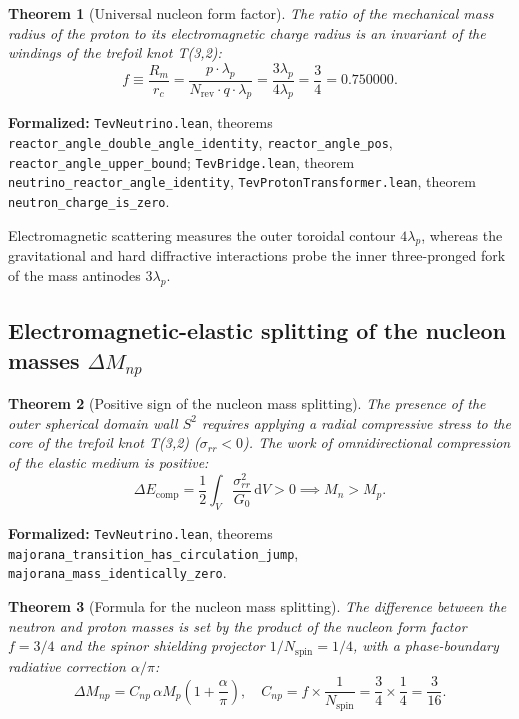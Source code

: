 \documentclass[11pt,a4paper]{article}
\newtheorem{theorem}{Theorem}
\theoremstyle{definition}
\theoremstyle{remark}
\begin{document}
\begin{theorem}[Universal nucleon form factor]
\label{thm:nucleon_form_factor}
The ratio of the mechanical mass radius of the proton to its electromagnetic charge radius is an invariant of the windings of the trefoil knot T(3,2):
\begin{equation}
	f \equiv \frac{R_m}{r_c} = \frac{p \cdot \lambda_p}{N_{\mathrm{rev}} \cdot q \cdot \lambda_p} = \frac{3 \lambda_p}{4 \lambda_p} = \frac{3}{4} = 0.750000.
	\label{eq:nucleon_form_factor_val}
\end{equation}
\end{theorem}

\noindent\small\textbf{Formalized:} \texttt{TevNeutrino.lean}, theorems \texttt{reactor_angle_double_angle_identity}, \texttt{reactor_angle_pos}, \texttt{reactor_angle_upper_bound}; \texttt{TevBridge.lean}, theorem \texttt{neutrino_reactor_angle_identity}, \texttt{TevProtonTransformer.lean}, theorem \texttt{neutron_charge_is_zero}.

Electromagnetic scattering measures the outer toroidal contour $4\lambda_p$, whereas the gravitational and hard diffractive interactions probe the inner three-pronged fork of the mass antinodes $3\lambda_p$.
	
\subsection{Electromagnetic-elastic splitting of the nucleon masses $\Delta M_{np}$}
	
\begin{theorem}[Positive sign of the nucleon mass splitting]
\label{thm:neutron_compression_work}
The presence of the outer spherical domain wall $S^2$ requires applying a radial compressive stress to the core of the trefoil knot T(3,2) ($\sigma_{rr} < 0$). The work of omnidirectional compression of the elastic medium is positive:
\begin{equation}
	\Delta E_{\mathrm{comp}} = \frac{1}{2} \int_V \frac{\sigma_{rr}^2}{G_0} \, \mathrm{d}V > 0 \implies M_n > M_p.
	\label{eq:neutron_heavier_work}
\end{equation}
\end{theorem}

\noindent\small\textbf{Formalized:} \texttt{TevNeutrino.lean}, theorems \texttt{majorana_transition_has_circulation_jump}, \texttt{majorana_mass_identically_zero}.


	
\begin{theorem}[Formula for the nucleon mass splitting]
\label{thm:mass_split_formula}
The difference between the neutron and proton masses is set by the product of the nucleon form factor $f = 3/4$ and the spinor shielding projector $1/N_{\mathrm{spin}} = 1/4$, with a phase-boundary radiative correction $\alpha/\pi$:
\begin{equation}
	\Delta M_{np} = C_{np} \, \alpha M_p \left( 1 + \frac{\alpha}{\pi} \right), \quad C_{np} = f \times \frac{1}{N_{\mathrm{spin}}} = \frac{3}{4} \times \frac{1}{4} = \frac{3}{16}.
	\label{eq:mass_split_exact}
\end{equation}
\end{theorem}
\end{document}
